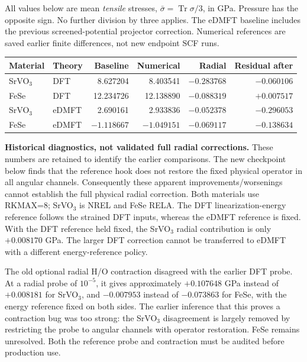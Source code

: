 \documentclass[11pt]{article}
\newcommand{\Tr}{\operatorname{Tr}}
\begin{document}
All values below are mean \emph{tensile} stresses, $\bar\sigma=\Tr\sigma/3$, in GPa. Pressure has the opposite sign. No further division by three applies. The eDMFT baseline includes the previous screened-potential projector correction. Numerical references are saved earlier finite differences, not new endpoint SCF runs.
\begin{center}\small
\begin{tabular}{llrrrr}\toprule
Material & Theory & Baseline & Numerical & Radial & Residual after\\\midrule
SrVO$_3$ & DFT & 8.627204 & 8.403541 & $-0.283768$ & $-0.060106$\\
FeSe & DFT & 12.234726 & 12.138890 & $-0.088319$ & $+0.007517$\\
SrVO$_3$ & eDMFT & 2.690161 & 2.933836 & $-0.052378$ & $-0.296053$\\
FeSe & eDMFT & $-1.118667$ & $-1.049151$ & $-0.069117$ & $-0.138634$\\\bottomrule
\end{tabular}
\end{center}
\textbf{Historical diagnostics, not validated full radial corrections.} These numbers are retained to identify the earlier comparisons. The new checkpoint below finds that the reference hook does not restore the fixed physical operator in all angular channels. Consequently these apparent improvements/worsenings cannot establish the full physical radial correction. Both materials use RKMAX=8; SrVO$_3$ is NREL and FeSe RELA. The DFT linearization-energy reference follows the strained DFT inputs, whereas the eDMFT reference is fixed. With the DFT reference held fixed, the SrVO$_3$ radial contribution is only $+0.008170$ GPa. The larger DFT correction cannot be transferred to eDMFT with a different energy-reference policy.

The old optional radial H/O contraction disagreed with the earlier DFT probe. At a radial probe of $10^{-5}$, it gives approximately $+0.107648$ GPa instead of $+0.008181$ for SrVO$_3$, and $-0.007953$ instead of $-0.073863$ for FeSe, with the energy reference fixed on both sides. The earlier inference that this proves a contraction bug was too strong: the SrVO$_3$ disagreement is largely removed by restricting the probe to angular channels with operator restoration. FeSe remains unresolved. Both the reference probe and contraction must be audited before production use.
\end{document}
